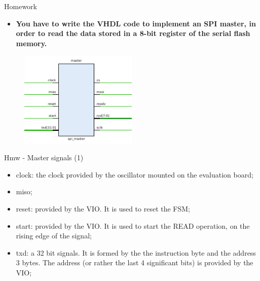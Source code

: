 \documentclass{beamer}
\begin{document}
     
   \begin{frame}{Homework}
   	
   	\begin{itemize}
   		\item \textbf{You have to write the VHDL code to implement an SPI master, in order to read the data stored in a 8-bit register of the serial flash memory.}
   	\end{itemize}	
    	\begin{figure}[!tbh]
    		\centering
    		\includegraphics*[width=0.5\textwidth]{images/master}
    	\end{figure}       	
   \end{frame}             


   \begin{frame}{Hmw - Master signals (1)}
   	 
   	\begin{itemize}
   		\item clock: the clock provided by the oscillator mounted on the evaluation board;
   		\item miso;
   		\item reset: provided by the VIO. It is used to reset the FSM;
   		\item start: provided by the VIO. It is used to start the READ operation, on the rising edge of the signal;
   		\item txd: a 32 bit signals. It is formed by the the instruction byte and the address 3 bytes. The address (or rather the last 4 significant bits) is provided by the VIO;
   	\end{itemize}     	
   \end{frame}      
 
\end{document}
